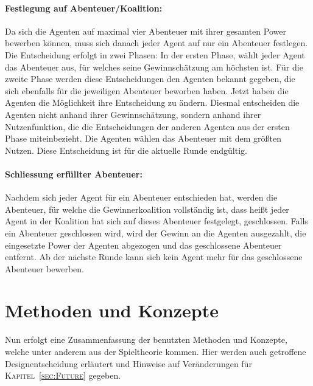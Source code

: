 \documentclass[fleqn,10pt]{SelfArx} %
\newcommand{\ChapterCite}[1]{\textsc{Kapitel~\ref{#1}}}
\begin{document}
\paragraph{Festlegung auf Abenteuer/Koalition:}
Da sich die Agenten auf maximal vier Abenteuer mit ihrer gesamten Power bewerben können, muss sich danach jeder Agent auf nur ein Abenteuer festlegen. Die Entscheidung erfolgt in zwei Phasen: In der ersten Phase, wählt jeder Agent das Abenteuer aus, für welches seine Gewinnschätzung am höchsten ist. Für die zweite Phase werden diese Entscheidungen den Agenten bekannt gegeben, die sich ebenfalls für die jeweiligen Abenteuer beworben haben. Jetzt haben die Agenten die Möglichkeit ihre Entscheidung zu ändern. Diesmal entscheiden die Agenten nicht anhand ihrer Gewinnschätzung, sondern anhand ihrer Nutzenfunktion, die die Entscheidungen der anderen Agenten aus der ersten Phase miteinbezieht. Die Agenten wählen das Abenteuer mit dem größten Nutzen. Diese Entscheidung ist für die aktuelle Runde endgültig.

\paragraph{Schliessung erfüllter Abenteuer:}
Nachdem sich jeder Agent für ein Abenteuer entschieden hat, werden die Abenteuer, für welche die Gewinnerkoalition vollständig ist, dass heißt jeder Agent in der Koalition hat sich auf dieses Abenteuer festgelegt, geschlossen. Falls ein Abenteuer geschlossen wird, wird der Gewinn an die Agenten ausgezahlt, die eingesetzte Power der Agenten abgezogen und das geschlossene Abenteuer entfernt. Ab der nächste Runde kann sich kein Agent mehr für das geschlossene Abenteuer bewerben.


\section{Methoden und Konzepte}
\label{sec:Methoden}
Nun erfolgt eine Zusammenfassung der benutzten Methoden und Konzepte, welche unter anderem aus der Spieltheorie kommen. Hier werden auch getroffene Designentscheidung erläutert und Hinweise auf Veränderungen für \ChapterCite{sec:Future} gegeben.
\end{document}
